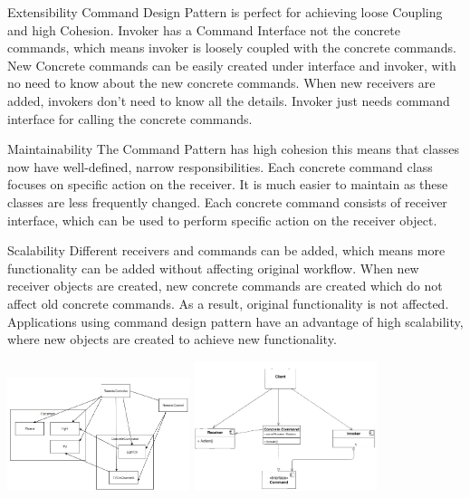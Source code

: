 \begin{nfps}
\item[Extensibility] Command Design Pattern is perfect for
    achieving loose Coupling and high Cohesion. Invoker has a Command Interface
    not the concrete commands, which means invoker is loosely coupled with the
    concrete commands. New Concrete commands can be easily created under
    interface and invoker, with no need to know about the new concrete
    commands.  When new receivers are added, invokers don't need to know all
    the details.  Invoker just needs command interface for calling the concrete
    commands.

\item[Maintainability] The Command Pattern has high cohesion this means that
    classes now have well-defined, narrow responsibilities. Each concrete
    command class focuses on specific action on the receiver. It is much easier
    to maintain as these classes are less frequently changed. Each concrete
    command consists of receiver interface, which can be used to perform
    specific action on the receiver object.

\item[Scalability] Different receivers and commands can be added, which means
    more functionality can be added without affecting original workflow. When
    new receiver objects are created, new concrete commands are created which
    do not affect old concrete commands. As a result, original functionality is
    not affected. Applications using command design pattern have an advantage
    of high scalability, where new objects are created to achieve new
    functionality.

\end{nfps}

\begin{center}
    \includegraphics[width=0.4\textwidth]{./command}
    \includegraphics[width=0.4\textwidth]{./command2}
\end{center}
